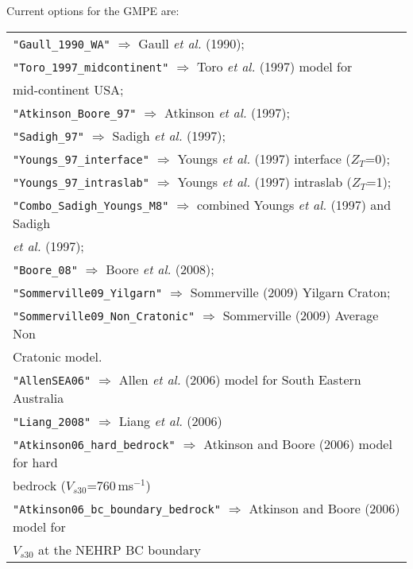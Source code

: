 Current options for the GMPE are: \\
\vspace{1em}
\begin{tabular}{|p{\textwidth}|}
\hline
\texttt{"Gaull\_1990\_WA"} $\Rightarrow$ Gaull \textit{et al.} (1990); \\
\texttt{"Toro\_1997\_midcontinent"}  $\Rightarrow$ Toro \textit{et al.} (1997) model for \\
    \hspace{8em} mid-continent USA; \\
\texttt{"Atkinson\_Boore\_97"}  $\Rightarrow$ Atkinson \textit{et al.} (1997); \\
\texttt{"Sadigh\_97"}  $\Rightarrow$ Sadigh \textit{et al.} (1997); \\
\texttt{"Youngs\_97\_interface"}  $\Rightarrow$ Youngs \textit{et al.} (1997) interface ($Z_T$=0); \\
\texttt{"Youngs\_97\_intraslab"}  $\Rightarrow$ Youngs \textit{et al.} (1997) intraslab ($Z_T$=1); \\
\texttt{"Combo\_Sadigh\_Youngs\_M8"}  $\Rightarrow$ combined Youngs \textit{et al.} (1997) and Sadigh \\
    \hspace{8em} \textit{et al.} (1997); \\
\texttt{"Boore\_08"}  $\Rightarrow$ Boore \textit{et al.} (2008); \\
\texttt{"Sommerville09\_Yilgarn"} $\Rightarrow$ Sommerville (2009) Yilgarn Craton; \\
\texttt{"Sommerville09\_Non\_Cratonic"} $\Rightarrow$ Sommerville (2009) Average Non \\
    \hspace{8em} Cratonic model. \\
\texttt{"AllenSEA06"} $\Rightarrow$ Allen \textit{et al.} (2006) model for South Eastern Australia \\
\texttt{"Liang\_2008"} $\Rightarrow$ Liang \textit{et al.} (2006) \\
\texttt{"Atkinson06\_hard\_bedrock"} $\Rightarrow$ Atkinson and Boore (2006) model for hard \\
    \hspace{8em} bedrock ($V_{s30}$=760\,ms$^{-1}$)\\
\texttt{"Atkinson06\_bc\_boundary\_bedrock"} $\Rightarrow$ Atkinson and Boore (2006) model for \\
\hspace{8em} $V_{s30}$ at the NEHRP BC boundary\\

\end{tabular}
